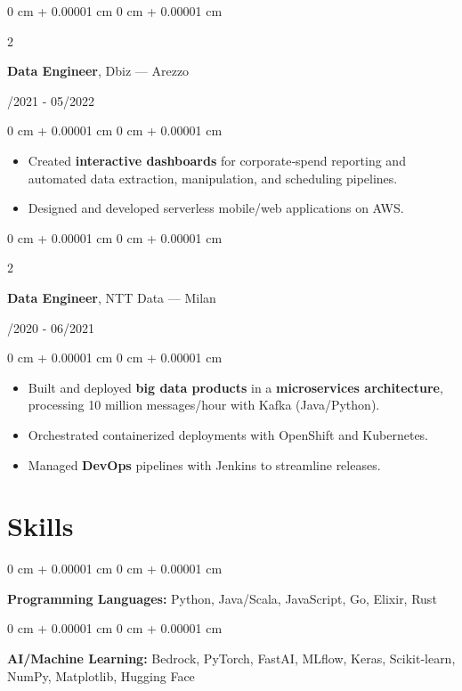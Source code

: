 \documentclass[10pt, letterpaper]{article}
\newenvironment{highlights}{
    \begin{itemize}[
        topsep=0.10 cm,
        parsep=0.10 cm,
        partopsep=0pt,
        itemsep=0pt,
        leftmargin=0 cm + 10pt
    ]
}{
    \end{itemize}
} %
\newenvironment{onecolentry}{
    \begin{adjustwidth}{
        0 cm + 0.00001 cm
    }{
        0 cm + 0.00001 cm
    }
}{
    \end{adjustwidth}
} %
\newenvironment{twocolentry}[2][]{
    \onecolentry
    \def\secondColumn{#2}
    \setcolumnwidth{\fill, 4.5 cm}
    \begin{paracol}{2}
}{
    \switchcolumn \raggedleft \secondColumn
    \end{paracol}
    \endonecolentry
} %
\begin{document}
\vspace{0.2 cm}

\begin{twocolentry}{06/2021 - 05/2022}
    \textbf{Data Engineer}, Dbiz — Arezzo
\end{twocolentry}
\begin{onecolentry}
    \begin{highlights}
        \item Created \textbf{interactive dashboards} for corporate‑spend reporting and automated data extraction, manipulation, and scheduling pipelines.
        \item Designed and developed serverless mobile/web applications on AWS.
    \end{highlights}
\end{onecolentry}

\vspace{0.2 cm}

\begin{twocolentry}{06/2020 - 06/2021}
    \textbf{Data Engineer}, NTT Data — Milan
\end{twocolentry}
\begin{onecolentry}
    \begin{highlights}
        \item Built and deployed \textbf{big data products} in a \textbf{microservices architecture}, processing 10 million messages/hour with Kafka (Java/Python).
        \item Orchestrated containerized deployments with OpenShift and Kubernetes.
        \item Managed \textbf{DevOps} pipelines with Jenkins to streamline releases.
    \end{highlights}
\end{onecolentry}

\section{Skills}

\begin{onecolentry}
    \textbf{Programming Languages:} Python, Java/Scala, JavaScript, Go, Elixir, Rust
\end{onecolentry}

\vspace{0.2 cm}

\begin{onecolentry}
    \textbf{AI/Machine Learning:} Bedrock, PyTorch, FastAI, MLflow, Keras, Scikit‑learn, NumPy, Matplotlib, Hugging Face
\end{onecolentry}
\end{document}
